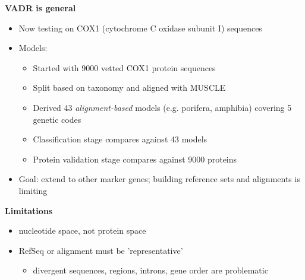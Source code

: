 \documentclass[landscape]{slides}
\begin{document}
\begin{slide}
\begin{center}
\textbf{VADR is general}
\end{center}

\small
\begin{itemize}
\item Now testing on COX1 (cytochrome C oxidase subunit I) sequences
\item Models:
  \begin{itemize}
  \item Started with 9000 vetted COX1 protein sequences
  \item Split based on taxonomy and aligned with MUSCLE
  \item Derived 43 \emph{alignment-based} models (e.g. porifera, amphibia) covering 5 genetic codes
  \item Classification stage compares against 43 models
  \item Protein validation stage compares against 9000 proteins
  \end{itemize}
\item Goal: extend to other marker genes; building reference
  sets and alignments is limiting
\end{itemize}

\vfill
\end{slide}
\begin{slide}
\begin{center}
\textbf{Limitations}
\end{center}

\small
\begin{itemize}
\item nucleotide space, not protein space
\item RefSeq or alignment must be 'representative'
  \begin{itemize}
    \item divergent sequences, regions, introns, gene order are problematic
  \end{itemize}
\end{itemize}

\vfill
\end{slide}
\end{document}
